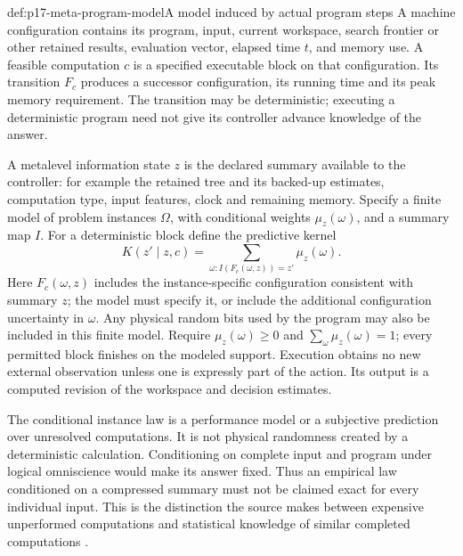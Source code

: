 \begin{hbdefinition}{def:p17-meta-program-model}{A model induced by actual program steps}
A machine configuration contains its program, input, current workspace,
search frontier or other retained results, evaluation vector, elapsed
time \(t\), and memory use. A feasible computation \(c\) is a
specified executable block on that configuration. Its transition
\(F_c\) produces a successor configuration, its running time and its
peak memory requirement. The transition may be deterministic; executing
a deterministic program need not give its controller advance knowledge
of the answer.

A metalevel information state \(z\) is the declared summary available
to the controller: for example the retained tree and its backed-up
estimates, computation type, input features, clock and remaining memory.
Specify a finite model of problem instances \(\Omega\), with
conditional weights \(\mu_z(\omega)\), and a summary map \(I\).
For a deterministic block define the predictive kernel
\[
 K(z'\mid z,c)=\sum_{\omega:
       I(F_c(\omega,z))=z'}\mu_z(\omega).
\]
Here \(F_c(\omega,z)\) includes the instance-specific configuration
consistent with summary \(z\); the model must specify it, or include
the additional configuration uncertainty in \(\omega\).
Any physical random bits used by the program may also be included in
this finite model. Require \(\mu_z(\omega)\geq0\) and
\(\sum_\omega\mu_z(\omega)=1\); every permitted block finishes
on the modeled support. Execution obtains no new external observation unless
one is expressly part of the action. Its output is a computed revision
of the workspace and decision estimates.

The conditional instance law is a performance model or a subjective
prediction over unresolved computations. It is not physical randomness
created by a deterministic calculation. Conditioning on complete input
and program under logical omniscience would make its answer fixed.
Thus an empirical law conditioned on a compressed summary must not be
claimed exact for every individual input. This is the distinction the
source makes between expensive unperformed computations and statistical
knowledge of similar completed computations
\cite[\S4.2, pp.~404--405]{RussellWefald1989KRMetareasoning}.
\end{hbdefinition}

